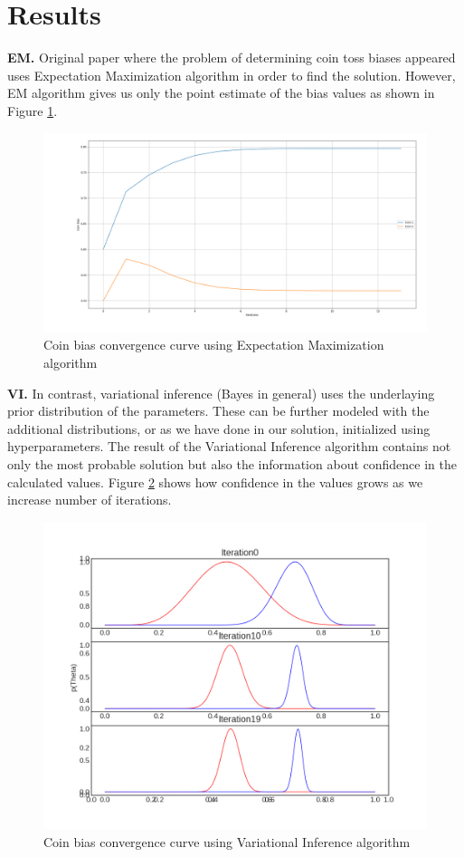 \documentclass{article}
\begin{document}
\section{Results}
\textbf{EM.} Original paper where the problem of determining coin toss biases appeared uses Expectation Maximization algorithm in order to find the solution. However, EM algorithm gives us only the point estimate of the bias values as shown in Figure \ref{em:conv}.
\begin{figure}[H]
\includegraphics[width=\textwidth]{EM_Convergence}
\caption{Coin bias convergence curve using Expectation Maximization algorithm}
\label{em:conv}
\end{figure}
\textbf{VI.} In contrast, variational inference (Bayes in general) uses the underlaying prior distribution of the parameters. These can be further modeled with the additional distributions, or as we have done in our solution, initialized using hyperparameters. The result of the Variational Inference algorithm contains not only the most probable solution but also the information about confidence in the calculated values. Figure \ref{vi:conv} shows how confidence in the values grows as we increase number of iterations.
\begin{figure}[H]
\includegraphics[width=\textwidth]{VI_Convergence}
\caption{Coin bias convergence curve using Variational Inference algorithm}
\label{vi:conv}
\end{figure}
\end{document}
